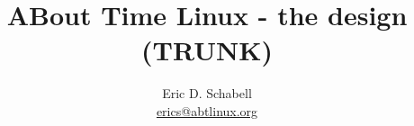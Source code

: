 \documentclass[a4paper]{article}
\begin{document}
\title{ABout Time Linux - the design\\ (TRUNK)}

\author{Eric D. Schabell \\ \url{erics@abtlinux.org}}

\maketitle






  
\end{document}
